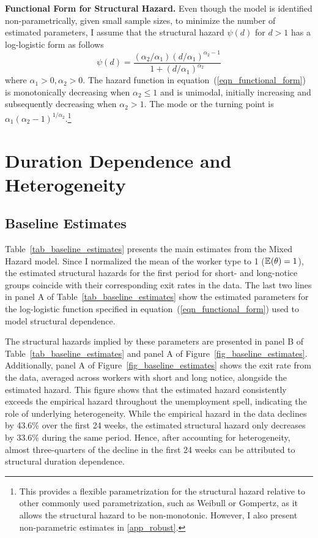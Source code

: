 \documentclass{div}
\newcommand{\ObsHazOnetoTwo}{43.6}
\newcommand{\EstHazOnetoTwo}{33.6}
\begin{document}
\textbf{Functional Form for Structural Hazard.} Even though the model is identified non-parametrically, given small sample sizes, to minimize the number of estimated parameters, I assume that the structural hazard $\psi(d)$ for $d>1$ has a log-logistic form as follows 
\begin{equation}\label{eqn_functional_form}
\psi(d) = \frac{(\alpha_2/\alpha_1) (d/\alpha_1)^{\alpha_2-1}}{1+(d/\alpha_1)^{\alpha_2}} 
\end{equation}
where $\alpha_1>0,\alpha_2>0$. The hazard function in equation~(\ref{eqn_functional_form}) is monotonically decreasing when $\alpha_2 \leq 1$ and is unimodal, initially increasing and subsequently decreasing when $\alpha_2>1$. The mode or the turning point is $\alpha_1 (\alpha_2-1)^{1/\alpha_2}$.\footnote{This provides a flexible parametrization for the structural hazard relative to other commonly used parametrization, such as Weibull or Gompertz, as it allows the structural hazard to be non-monotonic. However, I also present non-parametric estimates in  \ref{app_robust}.}


\section{Duration Dependence and Heterogeneity}\label{sec_estimates}

\subsection{Baseline Estimates}


Table~\ref{tab_baseline_estimates} presents the main estimates from the Mixed Hazard model. Since I normalized the mean of the worker type to 1 ($\E(\theta)=1$), the estimated structural hazards for the first period for short- and long-notice groups coincide with their corresponding exit rates in the data. The last two lines in panel A of Table~\ref{tab_baseline_estimates} show the estimated parameters for the log-logistic function specified in equation~(\ref{eqn_functional_form}) used to model structural dependence. 

The structural hazards implied by these parameters are presented in panel B of Table~\ref{tab_baseline_estimates} and panel A of Figure~\ref{fig_baseline_estimates}. Additionally, panel A of Figure~\ref{fig_baseline_estimates} shows the exit rate from the data, averaged across workers with short and long notice, alongside the estimated hazard. This figure shows that the estimated hazard consistently exceeds the empirical hazard throughout the unemployment spell, indicating the role of underlying heterogeneity. While the empirical hazard in the data declines by \ObsHazOnetoTwo\% over the first 24 weeks, the estimated structural hazard only decreases by \EstHazOnetoTwo\% during the same period. Hence, after accounting for heterogeneity, almost three-quarters of the decline in the first 24 weeks can be attributed to structural duration dependence.
\end{document}
